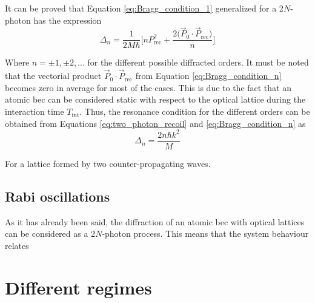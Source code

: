 It can be proved that Equation \eqref{eq:Bragg_condition_1} generalized for a 2$N$-photon has the expression \cite{Kozuma1999}
\begin{equation}\label{eq:Bragg_condition_n}
	\Delta_n = \frac{1}{2M\hbar} \Bigg[n P_{\text{rec}}^2 + \frac{2\big(\vec{P}_0 \cdot \vec{P}_{\text{rec}}\big)}{n}\Bigg]
\end{equation}

Where $n=\pm1, \pm2, \text{...}$ for the different possible diffracted orders. It must be noted that the vectorial product $\vec{P}_0 \cdot \vec{P}_{\text{rec}}$ from Equation \eqref{eq:Bragg_condition_n} becomes zero in average for most of the cases. This is due to the fact that an atomic \ac{bec} can be considered static with respect to the optical lattice during the interaction time $T_{\text{int}}$. Thus, the resonance condition for the different orders can be obtained from Equations \eqref{eq:two_photon_recoil} and \eqref{eq:Bragg_condition_n} as
\begin{equation}
	\Delta_n = \frac{2n\hbar k^2}{M}
\end{equation}

For a lattice formed by two counter-propagating waves.

\subsection{Rabi oscillations}

As it has already been said, the diffraction of an atomic \ac{bec} with optical lattices can be considered as a 2$N$-photon process. This means that the system behaviour relates 

\cite{Kozuma1999,Martin1988,Giltner1995}

\newpage

\section{Different regimes}


